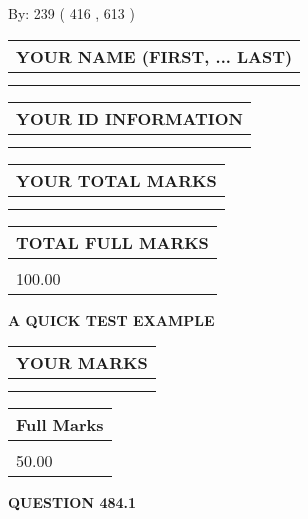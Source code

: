 \documentclass[12pt]{article}
\begin{document}
   
\hspace{1.0in} By: 
 239 ( 416 ,  613 )
   
   
   
   
\newpage 
\setcounter{page}{ 
   484001 } 
   
   
   
   
\noindent\begin{tabular}{|l|}
\hline
YOUR NAME (FIRST, ... LAST)  \\
\hline
 \\ 
 \\ 
\hline
\end{tabular}
\hspace{0.05in} \begin{tabular}{|l|}
\hline
 YOUR   ID   INFORMATION  \\
\hline
 \\ 
 \\ 
\hline
\end{tabular}
   
   
\vspace{0.2in}\noindent\begin{tabular}{|l|}
\hline
YOUR TOTAL MARKS  \\
\hline
 \\ 
 \\ 
\hline
\end{tabular}
\hspace{0.05in} \begin{tabular}{|l|}
\hline
TOTAL FULL MARKS  \\
\hline
 \\ 
100.00 \\
\hline
\end{tabular}
   
   
 \vspace{0.2in}
{\LARGE {\textbf{ A QUICK TEST EXAMPLE}}}
   
   
  
\vspace{0.2in}
  
\noindent\begin{tabular}{|l|}
\hline
 YOUR MARKS  \\
\hline
 \\ 
 \\ 
\hline
\end{tabular}
\hspace{0.05in} \begin{tabular}{|l|}
\hline
 Full Marks  \\
\hline
 \\ 
50.00 \\
\hline
\end{tabular}
{\textbf{\Large{QUESTION
484.1 
}}}
  
\end{document}
